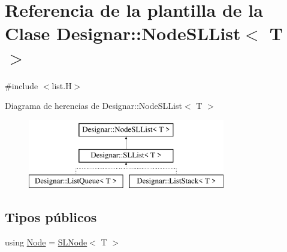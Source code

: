 \hypertarget{class_designar_1_1_node_s_l_list}{}\section{Referencia de la plantilla de la Clase Designar\+:\+:Node\+S\+L\+List$<$ T $>$}
\label{class_designar_1_1_node_s_l_list}


{\ttfamily \#include $<$list.\+H$>$}

Diagrama de herencias de Designar\+:\+:Node\+S\+L\+List$<$ T $>$\begin{figure}[H]
\begin{center}
\leavevmode
\includegraphics[height=3.000000cm]{class_designar_1_1_node_s_l_list}
\end{center}
\end{figure}
\subsection*{Tipos públicos}
\begin{DoxyCompactItemize}
\item 
using \hyperlink{class_designar_1_1_node_s_l_list_a41963019ada1025099e3259207a3de96}{Node} = \hyperlink{class_designar_1_1_s_l_node}{S\+L\+Node}$<$ T $>$
\end{DoxyCompactItemize}
